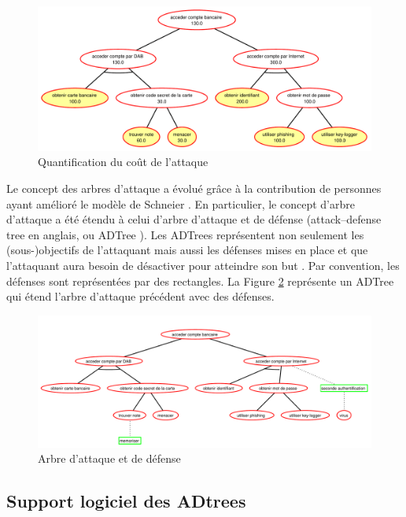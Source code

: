         \begin{figure}[h]
	        \centering
	        \includegraphics[width=1\textwidth]{figure/quantification.pdf}
	        \caption{Quantification du coût de l'attaque}
	        \label{fig:arbre_exemple_2}
        \end{figure}

		Le concept des arbres d'attaque a évolué grâce à la contribution de personnes ayant amélioré le modèle de Schneier \cite{ADTreeKordy}. En particulier, le concept d'arbre d'attaque a été étendu à celui d’arbre d’attaque et de défense (\og attack–defense tree \fg{} en anglais, ou \og ADTree \fg{}). Les ADTrees représentent non seulement les (sous-)objectifs de l'attaquant mais aussi les défenses mises en place et que l'attaquant aura besoin de désactiver pour atteindre son but \cite{ADTreeOxford}. Par convention, les défenses sont représentées par des rectangles. La Figure \ref{fig:arbre_exemple_3} représente un ADTree qui étend l'arbre d'attaque précédent avec des défenses.
        \begin{figure}[h]
			\centering
	        \includegraphics[width=1\textwidth]{figure/exemple2_rapport.pdf}
	        \caption{Arbre d'attaque et de défense}
	        \label{fig:arbre_exemple_3}
        \end{figure}



        \subsection{Support logiciel des ADtrees}

